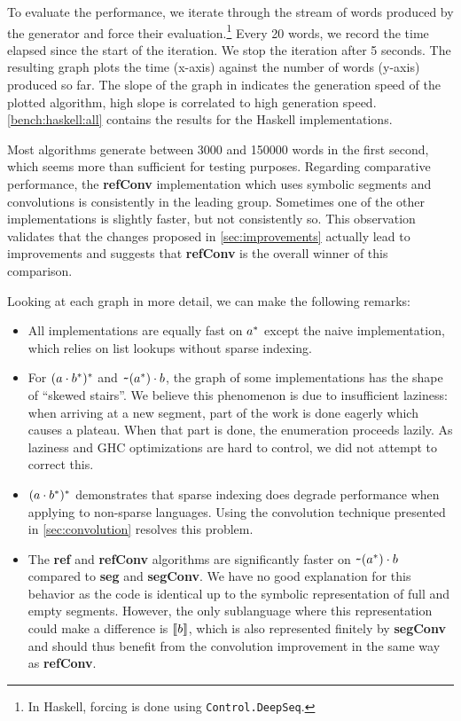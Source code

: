 To evaluate the performance, we iterate through the stream of words
produced by the generator and force their evaluation.\footnote{In
  Haskell, forcing is done using \lstinline{Control.DeepSeq}.} Every
20 words, we record the time elapsed since the start of the iteration. We
stop the iteration after 5 seconds. The resulting graph plots the time (x-axis) against the number of words (y-axis) produced so far. The slope of the graph in indicates the generation speed of the plotted algorithm, high slope is correlated to high generation speed.  \cref{bench:haskell:all} contains the results for the Haskell implementations.

Most algorithms generate between 3000 and 150000 words in the first
second, which seems more than sufficient for testing purposes.
Regarding comparative performance, the \textbf{refConv} implementation
which uses symbolic segments and convolutions is consistently in the
leading group. Sometimes one of the other implementations is slightly
faster, but not consistently so. This observation validates that the
changes proposed in \cref{sec:improvements} actually lead to
improvements and suggests that \textbf{refConv} is the overall winner
of this comparison.

Looking at each graph in more detail, we can make the following
remarks:
\begin{itemize}[leftmargin=*]
\item All implementations are equally fast on $a^*$ except
  the naive implementation, which  relies on list lookups without
  sparse indexing.
\item For $(a \cdot{b^*})^*$ and
  $\texttt{\textasciitilde}{(a^*)} \cdot{b}$, the graph of some implementations
  has the shape of ``skewed stairs''. We believe this phenomenon is due to
  insufficient laziness: when arriving at a new segment, part of the
  work is done eagerly which causes a plateau. When that part is done,
  the enumeration proceeds lazily.  As laziness and GHC
  optimizations are hard to control, we did not attempt to correct this.
\item $(a \cdot{b^*})^*$ demonstrates that sparse indexing
  does degrade performance when applying  to non-sparse languages.
  Using the convolution technique presented in \cref{sec:convolution} resolves this problem.
\item The \textbf{ref} and \textbf{refConv} algorithms are
  significantly faster on $\texttt{\textasciitilde}{(a^*)} \cdot{b}$
  compared to \textbf{seg} and \textbf{segConv}. We have no good
  explanation for this behavior as the code is identical up to the
  symbolic representation of full and empty segments. However, the
  only sublanguage where this representation could make a difference
  is $\llbracket b\rrbracket$, which is also represented finitely by
  \textbf{segConv} and should thus benefit from the convolution
  improvement in the same way as \textbf{refConv}.
\end{itemize}


